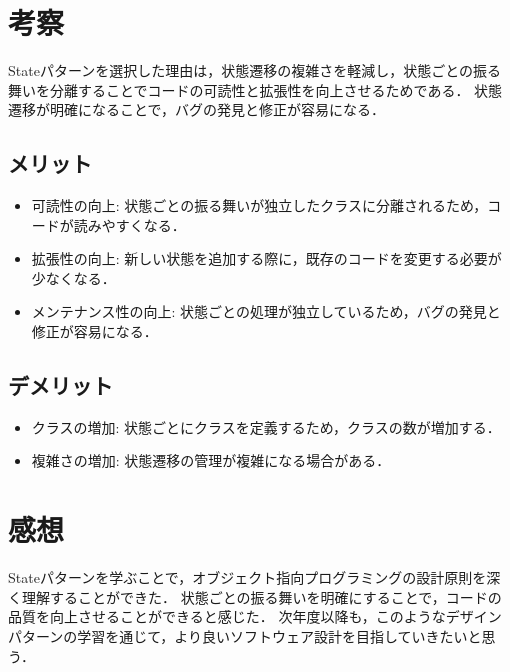 \documentclass[titlepage,a4paper]{jsarticle}
\begin{document}
\section{考察}
Stateパターンを選択した理由は，状態遷移の複雑さを軽減し，状態ごとの振る舞いを分離することでコードの可読性と拡張性を向上させるためである．
状態遷移が明確になることで，バグの発見と修正が容易になる．
\subsection{メリット}
\begin{itemize}
  \item 可読性の向上: 状態ごとの振る舞いが独立したクラスに分離されるため，コードが読みやすくなる．
  \item 拡張性の向上: 新しい状態を追加する際に，既存のコードを変更する必要が少なくなる．
  \item メンテナンス性の向上: 状態ごとの処理が独立しているため，バグの発見と修正が容易になる．
\end{itemize}
\subsection{デメリット}
\begin{itemize}
  \item クラスの増加: 状態ごとにクラスを定義するため，クラスの数が増加する．
  \item 複雑さの増加: 状態遷移の管理が複雑になる場合がある．
\end{itemize}

\section{感想}
Stateパターンを学ぶことで，オブジェクト指向プログラミングの設計原則を深く理解することができた．
状態ごとの振る舞いを明確にすることで，コードの品質を向上させることができると感じた．
次年度以降も，このようなデザインパターンの学習を通じて，より良いソフトウェア設計を目指していきたいと思う．
\end{document}
